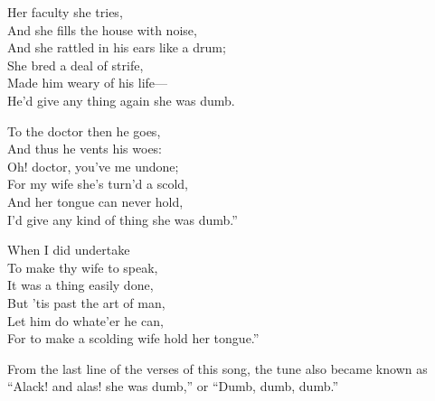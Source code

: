 \begin{dcverse}
\begin{patverse}
\vin Her faculty she tries,\\
And she fills the house with noise,\\
And she rattled in his ears like a drum;\\
She bred a deal of strife,\\
Made him weary of his life—\\
He’d give any thing again she was dumb.
\end{patverse}

\begin{patverse}
\vin To the doctor then he goes,\\
And thus he vents his woes:\\
Oh! doctor, you’ve me undone;\\
For my wife she’s turn’d a scold,\\
And her tongue can never hold,\\
I’d give any kind of thing she was dumb.”
\end{patverse}

\begin{patverse}
\vin {}When I did undertake\\
To make thy wife to speak,\\
It was a thing easily done,\\
But ’tis past the art of man,\\
Let him do whate’er he can,\\
For to make a scolding wife hold her tongue.”
\end{patverse}
\end{dcverse}

From the last line of the verses of this song, the tune also became known as
“Alack! and alas! she was dumb,” or “Dumb, dumb, dumb.”

\noindent\begin{minipage}{\textwidth}
\smallskip

\end{minipage}

\pagebreak
